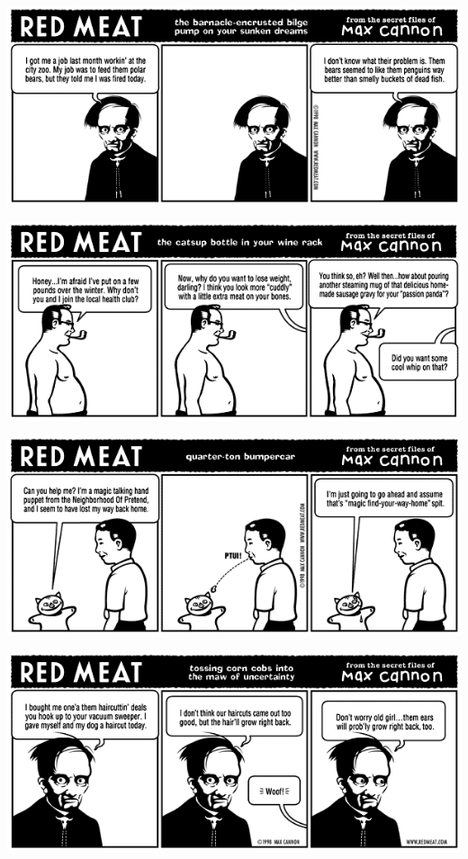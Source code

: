 \documentclass[a4paper,twoside,11pt]{article}
\begin{document}
\includegraphics[width=\textwidth]{redmeat_1998-05-11.png}



\includegraphics[width=\textwidth]{redmeat_1998-05-18.png}



\includegraphics[width=\textwidth]{redmeat_1998-05-25.png}



\includegraphics[width=\textwidth]{redmeat_1998-06-01.png}
\end{document}
